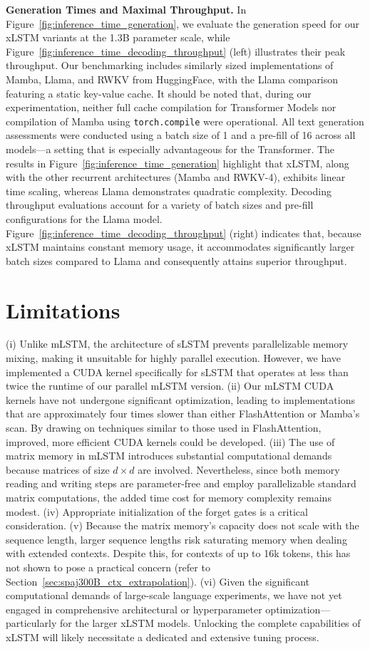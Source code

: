 \textbf{Generation Times and Maximal Throughput.} In Figure~\ref{fig:inference_time_generation}, we evaluate the generation speed for our xLSTM variants at the 1.3B parameter scale, while Figure~\ref{fig:inference_time_decoding_throughput} (left) illustrates their peak throughput. Our benchmarking includes similarly sized implementations of Mamba, Llama, and RWKV from HuggingFace, with the Llama comparison featuring a static key-value cache. It should be noted that, during our experimentation, neither full cache compilation for Transformer Models nor compilation of Mamba using \texttt{torch.compile} were operational. All text generation assessments were conducted using a batch size of 1 and a pre-fill of 16 across all models—a setting that is especially advantageous for the Transformer. The results in Figure~\ref{fig:inference_time_generation} highlight that xLSTM, along with the other recurrent architectures (Mamba and RWKV-4), exhibits linear time scaling, whereas Llama demonstrates quadratic complexity. Decoding throughput evaluations account for a variety of batch sizes and pre-fill configurations for the Llama model. Figure~\ref{fig:inference_time_decoding_throughput} (right) indicates that, because xLSTM maintains constant memory usage, it accommodates significantly larger batch sizes compared to Llama and consequently attains superior throughput.

\section{Limitations}

(i) Unlike mLSTM, the architecture of sLSTM prevents parallelizable memory mixing, making it unsuitable for highly parallel execution. However, we have implemented a CUDA kernel specifically for sLSTM that operates at less than twice the runtime of our parallel mLSTM version. (ii) Our mLSTM CUDA kernels have not undergone significant optimization, leading to implementations that are approximately four times slower than either FlashAttention or Mamba's scan. By drawing on techniques similar to those used in FlashAttention, improved, more efficient CUDA kernels could be developed. (iii) The use of matrix memory in mLSTM introduces substantial computational demands because matrices of size $d \times d$ are involved. Nevertheless, since both memory reading and writing steps are parameter-free and employ parallelizable standard matrix computations, the added time cost for memory complexity remains modest. (iv) Appropriate initialization of the forget gates is a critical consideration. (v) Because the matrix memory’s capacity does not scale with the sequence length, larger sequence lengths risk saturating memory when dealing with extended contexts. Despite this, for contexts of up to 16k tokens, this has not shown to pose a practical concern (refer to Section~\ref{sec:spaj300B_ctx_extrapolation}). (vi) Given the significant computational demands of large-scale language experiments, we have not yet engaged in comprehensive architectural or hyperparameter optimization—particularly for the larger xLSTM models. Unlocking the complete capabilities of xLSTM will likely necessitate a dedicated and extensive tuning process.

